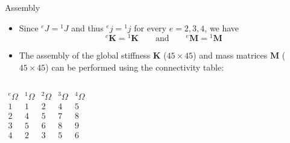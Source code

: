 \documentclass[aspectratio=169]{beamer}
\begin{document}
\begin{frame}{Assembly}
  \vspace{-0.2cm}
  \begin{itemize}
    \item Since ${}^e J={}^1 J$ and thus ${}^e j={}^1 j$ for every $e=2,3,4$, we have
          $${}^e\mathbf K={}^1\mathbf K\qquad\text{and}\qquad {}^e\mathbf M={}^1\mathbf M$$
    \item The assembly of the global stiffness $\mathbf K$ ($45\times 45$) and mass matrices $\mathbf M$ ($45\times 45$) can be performed using the connectivity table:
  \end{itemize}
  \vspace{-0.3cm}
  \begin{columns}
    \vspace{-0.7cm}
    \begin{center}
      \[
        \begin{array}{c|cccc}
          ^e\Omega & ^1\Omega & ^2\Omega & ^3\Omega & ^4\Omega \\
          \hline
          1        & 1        & 2        & 4        & 5        \\
          2        & 4        & 5        & 7        & 8        \\
          3        & 5        & 6        & 8        & 9        \\
          4        & 2        & 3        & 5        & 6        \\
        \end{array}
      \]
    \end{center}


\end{columns}
\end{frame}
\end{document}
